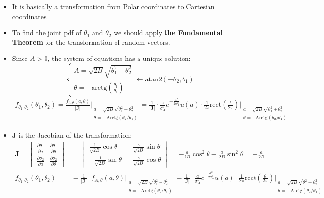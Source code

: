 \begin{itemize}
\item It is basically a transformation from Polar coordinates to Cartesian coordinates.
\item To find the joint pdf of \(\theta_1\) and \(\theta_2\) we should apply \textbf{the Fundamental Theorem} for the transformation of random vectors.
\item Since \(A>0\), the system of equations has a unique solution:
\[\begin{cases}
A = \sqrt{2B} \sqrt{\theta_{1}^{2} + \theta_{2}^{2}} \\
\theta = -\text{arctg} \left(\frac{\theta_{2}}{\theta_{1}}\right)
\end{cases}
\longleftarrow \text{atan2}(-\theta_{2}, \theta_{1})\]\vspace{-1em}
\begin{gather*}
f_{\theta_{1},\theta_{2}}(\theta_{1}, \theta_{2}) = \frac{f_{A,\theta}(a,\theta)}{|\mathbf{J}|} \Bigg|_{\substack{a=\sqrt{2B}\sqrt{\theta_{1}^{2}+\theta_{2}^{2}} \\ \theta=-\text{Arctg}(\theta_{2}/\theta_{1})}} = \frac{1}{|\mathbf{J}|} \cdot \frac{a}{\sigma_{A}^{2}} e^{-\frac{a^{2}}{2\sigma_{A}^{2}}}u(a) \cdot \frac{1}{2\pi}\text{rect}\left(\frac{\theta}{2\pi}\right) \Bigg|_{\substack{a=\sqrt{2B}\sqrt{\theta_{1}^{2}+\theta_{2}^{2}} \\ \theta=-\text{Arctg}(\theta_{2}/\theta_{1})}}
\end{gather*}
\item \textbf{J} is the Jacobian of the transformation:
\begin{align*}
\mathbf{J} = \begin{vmatrix}
\frac{\partial \theta_{1}}{\partial a} & \frac{\partial \theta_{1}}{\partial \theta} \\
\frac{\partial \theta_{2}}{\partial a} & \frac{\partial \theta_{2}}{\partial \theta}
\end{vmatrix} &= \begin{vmatrix}
\frac{1}{\sqrt{2B}} \cos \theta & - \frac{a}{\sqrt{2B}} \sin \theta \\
- \frac{1}{\sqrt{2B}} \sin \theta & - \frac{a}{\sqrt{2B}} \cos \theta
\end{vmatrix} = - \frac{a}{2B} \cos^{2} \theta - \frac{a}{2B} \sin^{2} \theta = - \frac{a}{2B}  \\[2em]
f_{\theta_{1},\theta_{2}}(\theta_{1}, \theta_{2}) &= \frac{1}{|\mathbf{J}|} \cdot f_{A,\theta}(a,\theta) \Bigg|_{\substack{a=\sqrt{2B}\sqrt{\theta_{1}^{2}+\theta_{2}^{2}} \\ \theta=-\text{Arctg}(\theta_{2}/\theta_{1})}} = \frac{1}{|\mathbf{J}|} \cdot \frac{a}{\sigma_{A}^{2}} e^{-\frac{a^{2}}{2\sigma_{A}^{2}}}u(a) \cdot \frac{1}{2\pi}\text{rect}\left(\frac{\theta}{2\pi}\right) \Bigg|_{\substack{a=\sqrt{2B}\sqrt{\theta_{1}^{2}+\theta_{2}^{2}} \\ \theta=-\text{Arctg}(\theta_{2}/\theta_{1})}} \\[1em]

\end{align*}
\end{itemize}
